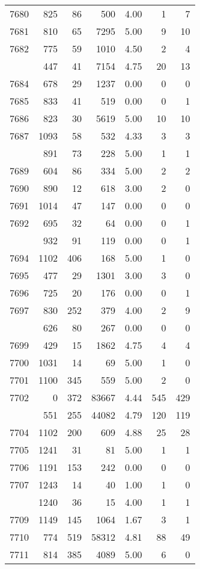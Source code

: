 \documentclass[
]{article}
\begin{document}
\begin{table}
\begin{tabular}[t]{lrrrrrr}
7680 & 825 & 86 & 500 & 4.00 & 1 & 7\\
7681 & 810 & 65 & 7295 & 5.00 & 9 & 10\\
7682 & 775 & 59 & 1010 & 4.50 & 2 & 4\\
\addlinespace
7683 & 447 & 41 & 7154 & 4.75 & 20 & 13\\
7684 & 678 & 29 & 1237 & 0.00 & 0 & 0\\
7685 & 833 & 41 & 519 & 0.00 & 0 & 1\\
7686 & 823 & 30 & 5619 & 5.00 & 10 & 10\\
7687 & 1093 & 58 & 532 & 4.33 & 3 & 3\\
\addlinespace
7688 & 891 & 73 & 228 & 5.00 & 1 & 1\\
7689 & 604 & 86 & 334 & 5.00 & 2 & 2\\
7690 & 890 & 12 & 618 & 3.00 & 2 & 0\\
7691 & 1014 & 47 & 147 & 0.00 & 0 & 0\\
7692 & 695 & 32 & 64 & 0.00 & 0 & 1\\
\addlinespace
7693 & 932 & 91 & 119 & 0.00 & 0 & 1\\
7694 & 1102 & 406 & 168 & 5.00 & 1 & 0\\
7695 & 477 & 29 & 1301 & 3.00 & 3 & 0\\
7696 & 725 & 20 & 176 & 0.00 & 0 & 1\\
7697 & 830 & 252 & 379 & 4.00 & 2 & 9\\
\addlinespace
7698 & 626 & 80 & 267 & 0.00 & 0 & 0\\
7699 & 429 & 15 & 1862 & 4.75 & 4 & 4\\
7700 & 1031 & 14 & 69 & 5.00 & 1 & 0\\
7701 & 1100 & 345 & 559 & 5.00 & 2 & 0\\
7702 & 0 & 372 & 83667 & 4.44 & 545 & 429\\
\addlinespace
7703 & 551 & 255 & 44082 & 4.79 & 120 & 119\\
7704 & 1102 & 200 & 609 & 4.88 & 25 & 28\\
7705 & 1241 & 31 & 81 & 5.00 & 1 & 1\\
7706 & 1191 & 153 & 242 & 0.00 & 0 & 0\\
7707 & 1243 & 14 & 40 & 1.00 & 1 & 0\\
\addlinespace
7708 & 1240 & 36 & 15 & 4.00 & 1 & 1\\
7709 & 1149 & 145 & 1064 & 1.67 & 3 & 1\\
7710 & 774 & 519 & 58312 & 4.81 & 88 & 49\\
7711 & 814 & 385 & 4089 & 5.00 & 6 & 0\\

\end{tabular}
\end{table}
\end{document}
